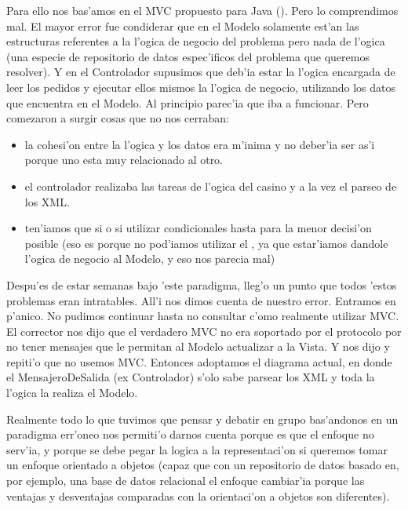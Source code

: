 Para ello nos bas'amos en el MVC propuesto para Java (\cite{MVC-Java}). Pero lo comprendimos mal. El mayor error fue condiderar que en el Modelo solamente est'an las estructuras referentes a la l'ogica de negocio del problema pero nada de l'ogica (una especie de repositorio de datos espec'ificos del problema que queremos resolver). Y en el Controlador supusimos que deb'ia estar la l'ogica encargada de leer los pedidos y ejecutar ellos mismos la l'ogica de negocio, utilizando los datos que encuentra en el Modelo. Al principio parec'ia que iba a funcionar. Pero comezaron a surgir cosas que no nos cerraban:

\begin{itemize}
\item la cohesi'on entre la l'ogica y los datos era m'inima y no deber'ia ser as'i porque uno esta muy relacionado al otro.
\item el controlador realizaba las tareas de l'ogica del casino y a la vez el parseo de los XML.
\item ten'iamos que si o si utilizar condicionales hasta para la menor decisi'on posible (eso es porque no pod'iamos utilizar el , ya que estar'iamos dandole l'ogica de negocio al Modelo, y eso nos parecia mal)
\end{itemize}

Despu'es de estar semanas bajo 'este paradigma, lleg'o un punto que todos 'estos problemas eran intratables. All'i nos dimos cuenta de nuestro error. Entramos en p'anico. No pudimos continuar hasta no consultar c'omo realmente utilizar MVC. El corrector nos dijo que el verdadero MVC no era soportado por el protocolo por no tener mensajes que le permitan al Modelo actualizar a la Vista. Y nos dijo y repiti'o que no usemos MVC. Entonces adoptamos el diagrama actual, en donde el MensajeroDeSalida (ex Controlador) s'olo sabe parsear los XML y toda la l'ogica la realiza el Modelo. 

Realmente todo lo que tuvimos que pensar y debatir en grupo bas'andonos en un paradigma err'oneo nos permiti'o darnos cuenta porque es que el enfoque no serv'ia, y porque se debe pegar la logica a la representaci'on si queremos tomar un enfoque orientado a objetos (capaz que con un repositorio de datos basado en, por ejemplo, una base de datos relacional el enfoque cambiar'ia porque las ventajas y desventajas comparadas con la orientaci'on a objetos son diferentes).


